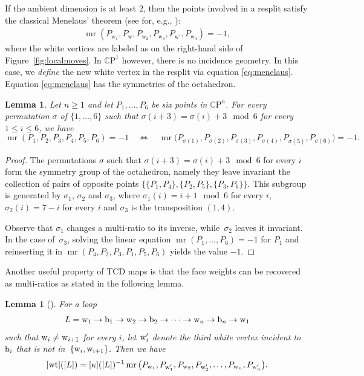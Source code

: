 \documentclass[10pt,a4paper]{amsart}
\numberwithin{equation}{section}
\newtheorem{Lemma}[Theorem]{Lemma}
\newcommand{\CP}{{\mathbb C\mathrm P}}
\newcommand{\ra}{\rightarrow}
\newcommand{\la}{\label}
\def\mr{\operatorname{mr}}
\begin{document}
	If the ambient dimension is at least $2$, then the points involved in a resplit satisfy the classical Menelaus' theorem (see for, e.g., \cite{Lester}):
	\begin{align}
		\label{eq:menelaus}
		\mr(P_{\mathrm w_1},P_{\mathrm w},P_{\mathrm w_2},P_{\mathrm w_3},P_{\mathrm w'},P_{\mathrm w_4}) = -1,
	\end{align}
	where the white vertices are labeled as on the right-hand side of Figure~\ref{fig:localmoves}. In $\CP^1$ however, there is no incidence geometry. In this case, we \emph{define} the new white vertex in the resplit via equation \eqref{eq:menelaus}. Equation \eqref{eq:menelaus} has the symmetries of the octahedron.
	
	\begin{Lemma}
		Let $n\geq1$ and let $P_1,\dots, P_6$ be six points in $\CP^n$. For every permutation $\sigma$ of $\{1,\dots,6\}$ such that $\sigma(i+3)=\sigma(i)+3 \mod 6$ for every $1\leq i \leq 6$, we have
		\[
		\mr(P_1,P_2,P_3,P_4,P_5,P_6)=-1 \quad\Leftrightarrow\quad \mr\big(P_{\sigma(1)},P_{\sigma(2)},P_{\sigma(3)},P_{\sigma(4)},P_{\sigma(5)},P_{\sigma(6)}\big)=-1.
		\]
	\end{Lemma}
	
	\begin{proof}
		The permutations $\sigma$ such that $\sigma(i+3)=\sigma(i)+3 \mod 6$ for every $i$ form the symmetry group of the octahedron, namely they leave invariant the collection of pairs of opposite points $\{\{P_1,P_4\},\{P_2,P_5\},\{P_3,P_6\}\}$. This subgroup is generated by $\sigma_1$, $\sigma_2$ and $\sigma_3$, where $\sigma_1(i)=i+1\mod 6$ for every $i$, $\sigma_2(i)=7-i$ for every $i$ and $\sigma_3$ is the transposition $(1,4)$.
		
		
		Observe that $\sigma_1$ changes a multi-ratio to its inverse, while~$\sigma_2$ leaves it invariant. In the case of~$\sigma_3$, solving the linear equation $\mr(P_1,\dots,P_6)=-1$ for $P_1$ and reinserting it in $\mr(P_4,P_2,P_3,\allowbreak P_1,P_5,P_6)$ yields the value $-1$.
	\end{proof}

	
	Another useful property of TCD maps is that the face weights can be recovered as multi-ratios as stated in the following lemma.
	
	\begin{Lemma}[]\la{lem:mrcyl}
		For a loop
\[
L = {\rm w}_1 \ra {\rm b}_1 \ra {\rm w}_2 \ra {\rm b}_2 \ra \cdots \ra {\rm w}_n \ra {\rm b}_n \ra {\rm w}_1
\] such that ${\rm w}_i \neq {\rm w}_{i+1}$ for every $i$, let ${\rm w}_i'$ denote the third white vertex incident to ${\rm b}_i$ that is not in~${\{{\rm w}_i,{\rm w}_{i+1}\}}$. Then we have
		\[
		[{\rm wt}]([L]) =[\kappa]([L])^{-1} \mr \big(P_{{\rm w}_1}, P_{{\rm w}_1'},P_{{\rm w}_2},P_{{\rm w}_2'},\dots, P_{{\rm w}_n},P_{{\rm w}_n'}\big) .
		\]
	\end{Lemma}
	
\end{document}
